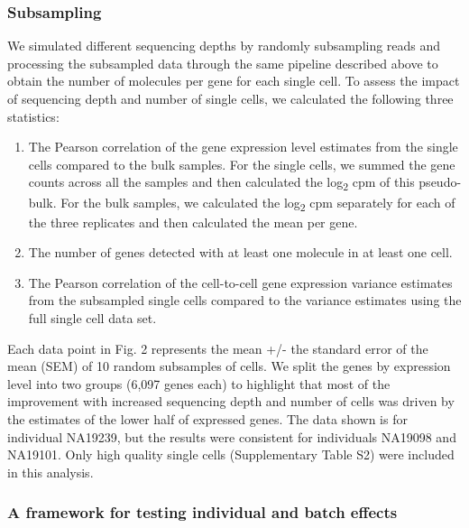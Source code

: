 \subsubsection{Subsampling}\label{subsampling}

We simulated different sequencing depths by randomly subsampling reads
and processing the subsampled data through the same pipeline described
above to obtain the number of molecules per gene for each single cell.
To assess the impact of sequencing depth and number of single cells, we
calculated the following three statistics:

\begin{enumerate}
\def\labelenumi{\arabic{enumi}.}
\itemsep1pt\parskip0pt
\item
  The Pearson correlation of the gene expression level estimates from
  the single cells compared to the bulk samples. For the single cells,
  we summed the gene counts across all the samples and then calculated
  the log\textsubscript{2} cpm of this pseudo-bulk. For the bulk
  samples, we calculated the log\textsubscript{2} cpm separately for
  each of the three replicates and then calculated the mean per gene.
\item
  The number of genes detected with at least one molecule in at least
  one cell.
\item
  The Pearson correlation of the cell-to-cell gene expression variance
  estimates from the subsampled single cells compared to the variance
  estimates using the full single cell data set.
\end{enumerate}

Each data point in Fig. 2 represents the mean +/- the standard error of
the mean (SEM) of 10 random subsamples of cells. We split the genes by
expression level into two groups (6,097 genes each) to highlight that
most of the improvement with increased sequencing depth and number of
cells was driven by the estimates of the lower half of expressed genes.
The data shown is for individual NA19239, but the results were
consistent for individuals NA19098 and NA19101. Only high quality single
cells (Supplementary Table S2) were included in this analysis.

\subsubsection{A framework for testing individual and batch
effects}\label{a-framework-for-testing-individual-and-batch-effects}

